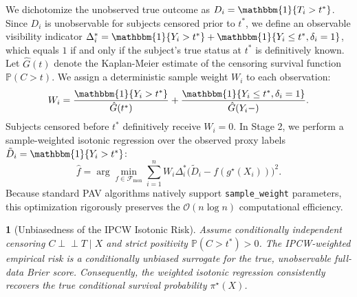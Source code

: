 \documentclass[11pt]{article}
\theoremstyle{plain}
\theoremstyle{plain}
\theoremstyle{plain}
\theoremstyle{plain}
\newtheorem{theorem}{\protect\theoremname}
\theoremstyle{plain}
\theoremstyle{plain}
\theoremstyle{plain}
\providecommand{\theoremname}{Theorem}
\begin{document}
{We dichotomize the unobserved true outcome as $D_i = \mathbbm{1}\{T_i > t^*\}$. Since $D_i$ is unobservable for subjects censored prior to $t^*$, we define an observable visibility indicator $\Delta_i^\ast = \mathbbm{1}\{Y_i > t^*\} + \mathbbm{1}\{Y_i \le t^*, \delta_i = 1\}$, which equals $1$ if and only if the subject's true status at $t^*$ is definitively known. Let $\hat{G}(t)$ denote the Kaplan-Meier estimate of the censoring survival function $\mathbb{P}(C > t)$. We assign a deterministic sample weight $W_i$ to each observation:
\begin{equation}
    W_i = \frac{\mathbbm{1}\{Y_i > t^*\}}{\hat{G}(t^*)} + \frac{\mathbbm{1}\{Y_i \le t^*, \delta_i = 1\}}{\hat{G}(Y_i-)}.
\end{equation}
Subjects censored before $t^*$ definitively receive $W_i = 0$. In Stage 2, we perform a sample-weighted isotonic regression over the observed proxy labels $\tilde{D}_i = \mathbbm{1}\{Y_i > t^*\}$:
\begin{equation}
    \hat{f} = \arg\min_{f \in \mathcal{F}_{\text{mon}}} \sum_{i=1}^n W_i \Delta_i^\ast \Big( \tilde{D}_i - f(g^\star(X_i)) \Big)^2.
\end{equation}
Because standard PAV algorithms natively support \texttt{sample\_weight} parameters, this optimization rigorously preserves the $\mathcal{O}(n \log n)$ computational efficiency.

\begin{theorem}[Unbiasedness of the IPCW Isotonic Risk]
\label{thm:ipcw_iso}
Assume conditionally independent censoring $C \perp\!\!\!\perp T \mid X$ and strict positivity $\mathbb{P}(C > t^*) > 0$. The IPCW-weighted empirical risk is a conditionally unbiased surrogate for the true, unobservable full-data Brier score. Consequently, the weighted isotonic regression consistently recovers the true conditional survival probability $\pi^\star(X)$.
\end{theorem}

}
\end{document}
